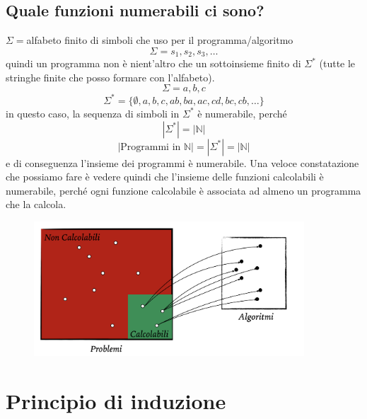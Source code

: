 \documentclass[a4paper]{article}
\begin{document}
\subsection{Quale funzioni numerabili ci sono?}
$\Sigma = $alfabeto finito di simboli che uso per il programma/algoritmo
\[\Sigma = {s_1, s_2, s_3, \dots}\] 
quindi un programma non è nient'altro che un sottoinsieme finito di $\Sigma^*$ (tutte le stringhe finite che posso formare con l'alfabeto).
\[\Sigma = {a,b,c}\]
\[\Sigma^* = \{\emptyset, a,b,c,ab,ba,ac,cd,bc,cb,\dots\}\]
in questo caso, la sequenza di simboli in $\Sigma^*$ è numerabile, perché
\[|\Sigma^*| = |\mathbb{N}|\]
\[|\text{Programmi in }\mathbb{N}| = |\Sigma^*| = |\mathbb{N}|\]
e di conseguenza l'insieme dei programmi è numerabile.
Una veloce constatazione che possiamo fare è vedere quindi che l'insieme delle funzioni 
calcolabili è numerabile, perché ogni funzione calcolabile 
è associata ad almeno un programma che la calcola.

\begin{figure}[H]
    \centering
    \includegraphics[width=0.9\textwidth]{fcalcolabili.png}
\end{figure}

\section{Principio di induzione}
\end{document}

